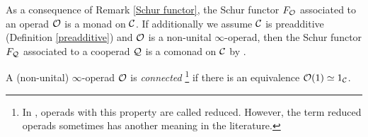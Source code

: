 \begin{remark}
\label{Schur functor and operads}
As a consequence of Remark \ref{Schur functor}, the Schur functor $F_{\mathcal{O}}$ associated to an operad ${\mathcal{O}}$ is a monad on ${\mathcal{C}}$.
If additionally we assume ${\mathcal{C}}$ is preadditive (Definition \ref{preadditive}) and ${\mathcal{O}}$ is a non-unital $\infty$-operad,
then the Schur functor $F_{\mathcal{Q}}$ associated to a cooperad ${\mathcal{Q}}$ is a comonad on ${\mathcal{C}}$ by \cite[Remark 2.21]{Haugsengsymseq}.
\end{remark}

\begin{definition}
	A (non-unital) $\infty$-operad ${\mathcal{O}}$ is \emph{connected} \footnote{In \cite{ChingBar}, operads with this property are called reduced. However, the term reduced operads sometimes has another meaning in the literature.} if there is an equivalence ${\mathcal{O}}(1)\simeq 1_{{\mathcal{C}}}$. 
\end{definition}






